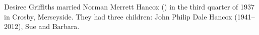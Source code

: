 \biohead{}{}

Desiree Griffiths married Norman Merrett Hancox () in the third quarter of 1937 in Crosby,	Merseyside. \cite{NMHancoxMarriage}   They had three children: John Philip Dale Hancox (1941--2012), Sue and Barbara.



